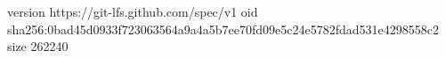 version https://git-lfs.github.com/spec/v1
oid sha256:0bad45d0933f723063564a9a4a5b7ee70fd09e5c24e5782fdad531e4298558c2
size 262240
